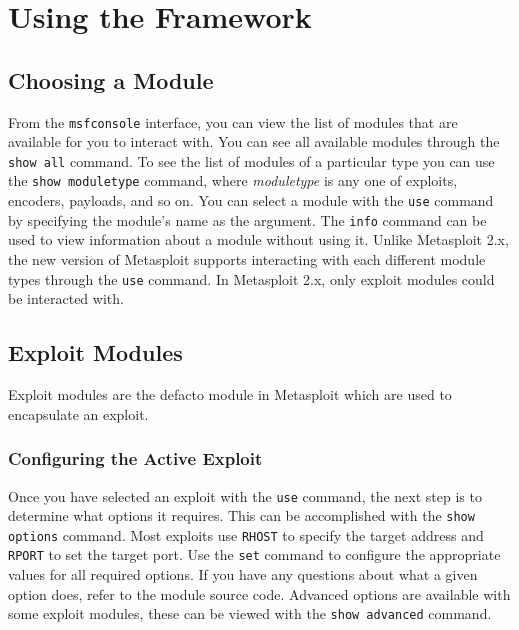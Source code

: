 \documentclass{report}
\begin{document}
\pagebreak

\chapter{Using the Framework}

	\section{Choosing a Module}
\par
From the \texttt{msfconsole} interface, you can view the list of modules that
are available for you to interact with.  You can see all available modules
through the \texttt{show all} command.  To see the list of modules of a
particular type you can use the \texttt{show moduletype} command, where
\textit{moduletype} is any one of exploits, encoders, payloads, and so on.  
You can select a module with the \texttt{use} command by specifying the
module's name as the argument.  The \texttt{info} command can be used to view
information about a module without using it.  Unlike Metasploit 2.x, the new
version of Metasploit supports interacting with each different module types
through the \texttt{use} command.  In Metasploit 2.x, only exploit modules
could be interacted with.

	\section{Exploit Modules}

\par
Exploit modules are the defacto module in Metasploit which are used to
encapsulate an exploit.

		\subsection{Configuring the Active Exploit}

\par 
Once you have selected an exploit with the \texttt{use} command, the next step
is to determine what options it requires. This can be accomplished with the
\texttt{show options} command. Most exploits use \texttt{RHOST} to specify the
target address and \texttt{RPORT} to set the target port. Use the \texttt{set}
command to configure the appropriate values for all required options. If you
have any questions about what a given option does, refer to the module source
code.  Advanced options are available with some exploit modules, these can be
viewed with the \texttt{show advanced} command. 
\end{document}
